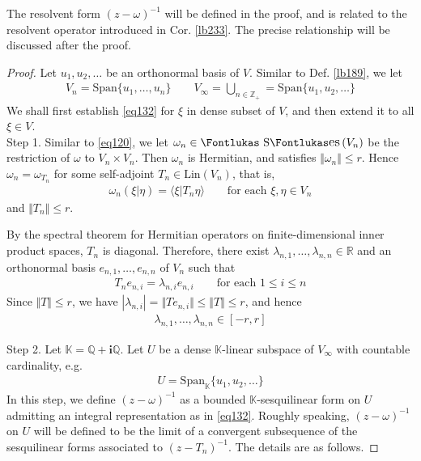 \documentclass[12pt,b5paper,notitlepage]{article}
\theoremstyle{definition}
\theoremstyle{plain}
\DeclareMathOperator{\Ses}{\text{\Fontlukas S}\text{\kern -0pt {\Fontlukas\large es}}\,}
\newcommand{\Span}{\mathrm{Span}}
\newcommand{\bk}[1]{\langle {#1}\rangle}
\newcommand{\im}{\mathbf{i}}
\newcommand{\Kbb}{\mathbb K}
\newcommand{\Zbb}{\mathbb Z}
\newcommand{\Qbb}{\mathbb Q}
\newcommand{\Rbb}{\mathbb R}
\newcommand{\Lin}{\mathrm{Lin}}
\numberwithin{equation}{section}
\begin{document}
The resolvent form $(z-\omega)^{-1}$ will be defined in the proof, and is related to the resolvent operator introduced in Cor. \ref{lb233}. The precise relationship will be discussed after the proof.


\begin{proof}
Let $u_1,u_2,\dots$ be an orthonormal basis of $V$. Similar to Def. \ref{lb189}, we let
\begin{align*}
V_n=\Span\{u_1,\dots,u_n\}\qquad V_\infty=\bigcup_{n\in\Zbb_+}=\Span\{u_1,u_2,\dots\}
\end{align*}
We shall first establish \eqref{eq132} for $\xi$ in dense subset of $V$, and then extend it to all $\xi\in V$.\\[-1ex]



Step 1. Similar to \eqref{eq120}, we let $\omega_n\in\Ses(V_n)$ be the restriction of $\omega$ to $V_n\times V_n$. Then $\omega_n$ is Hermitian, and satisfies $\Vert\omega_n\Vert\leq r$. Hence $\omega_n=\omega_{T_n}$ for some self-adjoint $T_n\in\Lin(V_n)$, that is,
\begin{align*}
\omega_n(\xi|\eta)=\bk{\xi|T_n\eta}\qquad\text{for each }\xi,\eta\in V_n
\end{align*}
and $\Vert T_n\Vert\leq r$.

By the spectral theorem for Hermitian operators on finite-dimensional inner product spaces, $T_n$ is diagonal. Therefore, there exist $\lambda_{n,1},\dots,\lambda_{n,n}\in\Rbb$ and an orthonormal basis $e_{n,1},\dots,e_{n,n}$ of $V_n$ such that
\begin{align*}
T_ne_{n,i}=\lambda_{n,i}e_{n,i}\qquad\text{for each }1\leq i\leq n
\end{align*}
Since $\Vert T\Vert\leq r$, we have $|\lambda_{n,i}|=\Vert Te_{n,i}\Vert\leq\Vert T\Vert\leq r$, and hence
\begin{align*}
\lambda_{n,1},\dots,\lambda_{n,n}\in [-r,r]
\end{align*}


Step 2. Let $\Kbb=\Qbb+\im\Qbb$. Let $U$ be a dense $\Kbb$-linear subspace of $V_\infty$ with countable cardinality, e.g.
\begin{align*}
U=\Span_\Kbb\{u_1,u_2,\dots\}
\end{align*}
In this step, we define $(z-\omega)^{-1}$ as a bounded $\Kbb$-sesquilinear form on $U$ admitting an integral representation as in \eqref{eq132}. Roughly speaking, $(z-\omega)^{-1}$ on $U$ will be defined to be the limit of a convergent subsequence of the sesquilinear forms associated to $(z-T_n)^{-1}$. The details are as follows.


\end{proof}
\end{document}

